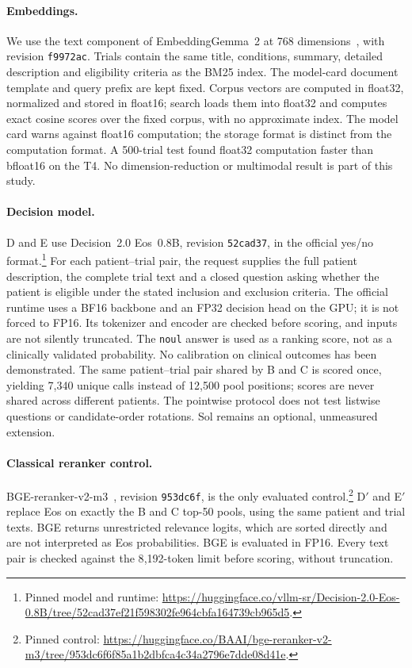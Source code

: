 \documentclass{article}
\begin{document}
\paragraph{Embeddings.} We use the text component of EmbeddingGemma~2 at 768 dimensions~\citep{embeddinggemma2}, with revision \texttt{f9972ac}. Trials contain the same title, conditions, summary, detailed description and eligibility criteria as the BM25 index. The model-card document template and query prefix are kept fixed. Corpus vectors are computed in float32, normalized and stored in float16; search loads them into float32 and computes exact cosine scores over the fixed corpus, with no approximate index. The model card warns against float16 computation; the storage format is distinct from the computation format. A 500-trial test found float32 computation faster than bfloat16 on the T4. No dimension-reduction or multimodal result is part of this study.

\paragraph{Decision model.} D and E use Decision~2.0 Eos~0.8B, revision \texttt{52cad37}, in the official yes/no format.\footnote{Pinned model and runtime: \url{https://huggingface.co/vllm-sr/Decision-2.0-Eos-0.8B/tree/52cad37ef21f598302fe964cbfa164739cb965d5}.} For each patient--trial pair, the request supplies the full patient description, the complete trial text and a closed question asking whether the patient is eligible under the stated inclusion and exclusion criteria. The official runtime uses a BF16 backbone and an FP32 decision head on the GPU; it is not forced to FP16. Its tokenizer and encoder are checked before scoring, and inputs are not silently truncated. The \texttt{noul} answer is used as a ranking score, not as a clinically validated probability. No calibration on clinical outcomes has been demonstrated. The same patient--trial pair shared by B and C is scored once, yielding 7{,}340 unique calls instead of 12{,}500 pool positions; scores are never shared across different patients. The pointwise protocol does not test listwise questions or candidate-order rotations. Sol remains an optional, unmeasured extension.

\paragraph{Classical reranker control.} BGE-reranker-v2-m3~\citep{chen2024bgem3}, revision \texttt{953dc6f}, is the only evaluated control.\footnote{Pinned control: \url{https://huggingface.co/BAAI/bge-reranker-v2-m3/tree/953dc6f6f85a1b2dbfca4c34a2796e7dde08d41e}.} D$'$ and E$'$ replace Eos on exactly the B and C top-50 pools, using the same patient and trial texts. BGE returns unrestricted relevance logits, which are sorted directly and are not interpreted as Eos probabilities. BGE is evaluated in FP16. Every text pair is checked against the 8{,}192-token limit before scoring, without truncation.
\end{document}
